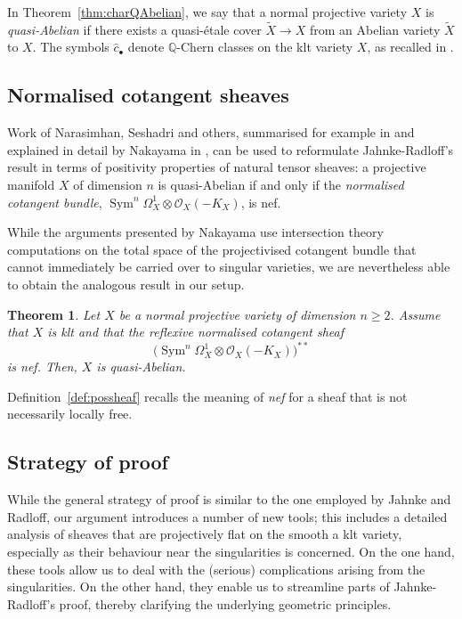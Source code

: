 \documentclass[JEP,XML,SOM,Unicode,published]{cedram}
\let\scr\mathscr
\let\vref\ref
\newcommand{\sbullet}{{\scriptscriptstyle\bullet}}
\theoremstyle{plain}
\newtheorem{thm}{Theorem}[section]
\theoremstyle{definition}
\numberwithin{equation}{thm}
\numberwithin{enumi}{thm}
\DeclareMathOperator{\Sym}{Sym}
\newcommand{\sO}{\scr{O}}
\newcommand{\bQ}{\mathbb{Q}}
\let\wtilde\widetilde
\let\what\widehat
\begin{document}
In Theorem~\ref{thm:charQAbelian}, we say that a normal projective variety $X$
is \emph{quasi-Abelian} if there exists a quasi-étale cover $\wtilde{X} \to X$
from an Abelian variety $\wtilde{X}$ to $X$. The symbols $\what{c}_\sbullet$ denote
$\bQ$-Chern classes on the klt variety $X$, as recalled in
\cite[\S 3]{GKPT19b}.

\subsection{Normalised cotangent sheaves}

Work of Narasimhan, Seshadri and others, summarised for example in
\cite[Th.\,1.1]{MR3030068} and explained in detail by Nakayama in
\cite[Th.\,A]{NakayamaNormalizedPreprint}, can be used to reformulate
Jahnke-Radloff's result in terms of positivity properties of natural tensor
sheaves: a projective manifold $X$ of dimension $n$ is quasi-Abelian if and only
if the \emph{normalised cotangent bundle}, $\Sym^n \Omega^1_X \otimes \sO_X(-K_X)$, is nef.

While the arguments presented by Nakayama use intersection theory computations
on the total space of the projectivised cotangent bundle that cannot immediately
be carried over to singular varieties, we are nevertheless able to obtain the
analogous result in our setup.

\begin{thm}\label{thm:6-1}
Let $X$ be a normal projective variety of dimension $n \geq 2$. Assume that $X$
is klt and that the reflexive normalised cotangent sheaf
\[
\bigl(\Sym^n\Omega^1_X \otimes \sO_X(-K_X)\bigr)^{**}
\]
is nef. Then, $X$ is quasi-Abelian.
\end{thm}

Definition~\vref{def:possheaf} recalls the meaning of \emph{nef} for a sheaf
that is not necessarily locally free.

\subsection{Strategy of proof}

While the general strategy of proof is similar to the one employed by Jahnke and
Radloff, our argument introduces a number of new tools; this includes a detailed
analysis of sheaves that are projectively flat on the smooth a klt variety,
especially as their behaviour near the singularities is concerned. On the one
hand, these tools allow us to deal with the (serious) complications arising from
the singularities. On the other hand, they enable us to streamline parts of
Jahnke-Radloff's proof, thereby clarifying the underlying geometric principles.
\end{document}
